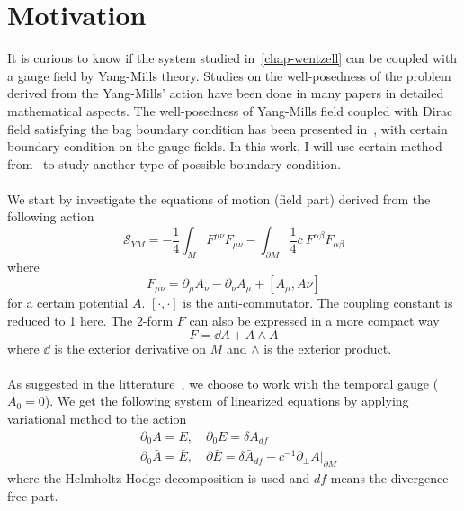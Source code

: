\section{Motivation}
It is curious to know if the system studied in~\cref{chap-wentzell} can be coupled with a gauge field by Yang-Mills theory. 
Studies on the well-posedness of the problem derived from the Yang-Mills' action have been done in many papers in detailed mathematical aspects. 
The well-posedness of Yang-Mills field coupled with Dirac field satisfying the bag boundary condition has been presented in~\cite{Sinatycki1993}, with certain boundary condition on the gauge fields.
In this work, I will use certain method from~\cite{Sinatycki1993} to study another type of possible boundary condition. \\\\
%
We start by investigate the equations of motion (field part) derived from the following action
\begin{equation}\label{ym-action}
\mathcal{S}_{YM} = -\frac 1 4 \int_M F^{\mu\nu} F_{\mu\nu} 
-\int_{\partial M} \frac 1 4 c\ F^{\alpha\beta} F_{\alpha\beta}
\end{equation}
where 
\begin{equation*}
F_{\mu\nu} = \partial_\mu A_\nu - \partial_\nu A_\mu + [A_\mu, A\nu]
\end{equation*}
for a certain potential $A$. $[\cdot, \cdot]$ is the anti-commutator. The coupling constant is reduced to 1 here. The $2$-form $F$ can also be expressed in a more compact way
\begin{equation*}
F = \dd A + A \wedge A
\end{equation*}
where $\dd$ is the exterior derivative on $M$ and $\wedge$ is the exterior product.\\\\
As suggested in the litterature~\cite{Tao2003}, 
we choose to work with the temporal gauge ($A_0 = 0$). 
We get the following system of linearized equations by applying variational method to the action
\begin{equation}
\begin{split}
& \partial_0 A = E, \quad \partial_0 E = \delta A_{df} \\
& \partial_0 \bar{A} = \bar{E} , \quad \partial \bar{E} = \delta \bar{A}_{df} - c^{-1}\partial_\bot A\vert_{\partial M}
\end{split}
\end{equation}
where the Helmholtz-Hodge decomposition is used and $df$ means the divergence-free part.
